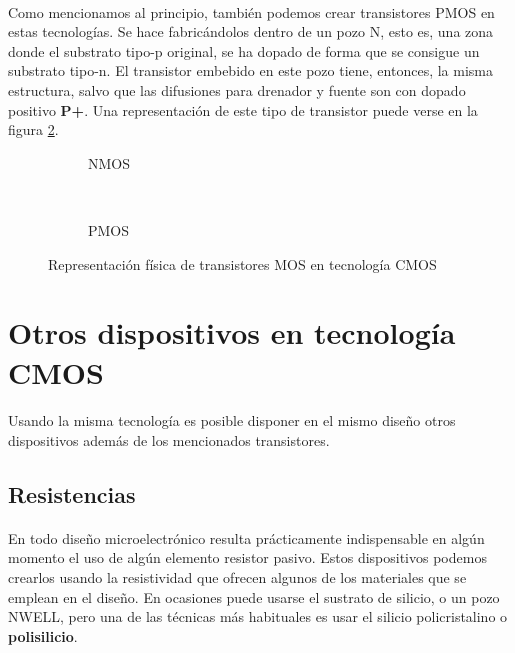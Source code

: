 \paragraph{}
Como mencionamos al principio, también podemos crear transistores PMOS en estas
tecnologías. Se hace fabricándolos dentro de un pozo N, esto es, una zona
donde el substrato tipo-p original, se ha dopado de forma que se consigue un substrato
tipo-n. El transistor embebido en este pozo tiene, entonces, la misma estructura,
salvo que las difusiones para drenador y fuente son con dopado positivo \textbf{P+}.
Una representación de este tipo de transistor puede verse en la figura \ref{fig:pmos}.

\begin{figure}[h]
	\centering
	\begin{subfigure}{0.45\textwidth}
		
		\caption{NMOS}
		\label{fig:nmos}
	\end{subfigure}
	~ %
	\begin{subfigure}{0.45\textwidth}
		
		\caption{PMOS}
		\label{fig:pmos}
	\end{subfigure}
	\caption{Representación física de transistores MOS en tecnología CMOS}
	\label{fig:cmos_transistors}
\end{figure}

\section{Otros dispositivos en tecnología CMOS}\label{cap:otros_dispositivos}

\paragraph{}
Usando la misma tecnología es posible disponer en el mismo diseño otros dispositivos
además de los mencionados transistores.

\subsection{Resistencias}
\paragraph{}
En todo diseño microelectrónico resulta prácticamente indispensable en algún
momento el uso de algún elemento resistor pasivo. Estos dispositivos podemos
crearlos usando la resistividad que ofrecen algunos de los materiales que se emplean
en el diseño. En ocasiones puede usarse el sustrato de silicio, o un pozo NWELL, pero
una de las técnicas más habituales es usar el silicio policristalino o \textbf{polisilicio}.

